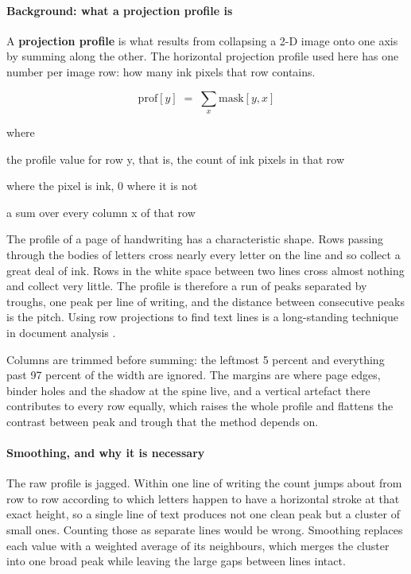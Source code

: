 \paragraph{Background: what a projection profile is}
A \textbf{projection profile} is what results from collapsing a 2-D image onto one axis by summing along the other. The horizontal projection profile used here has one number per image row: how many ink pixels that row contains.


\begin{equation}
\mathrm{prof}[y] \;=\; \sum_{x} \mathrm{mask}[y,x]
\end{equation}

\noindent where
\begin{description}[leftmargin=2.4em,style=nextline,font=\normalfont\ttfamily]\setlength\itemsep{1pt}
  \item[{$\mathrm{prof}[y]$}] \normalfont the profile value for row y, that is, the count of ink pixels in that row
  \item[{$\mathrm{mask}[y,x]$}]  where the pixel is ink, 0 where it is not
  \item[{$\sum_{x}$}] \normalfont a sum over every column x of that row
\end{description}
The profile of a page of handwriting has a characteristic shape. Rows passing through the bodies of letters cross nearly every letter on the line and so collect a great deal of ink. Rows in the white space between two lines cross almost nothing and collect very little. The profile is therefore a run of peaks separated by troughs, one peak per line of writing, and the distance between consecutive peaks is the pitch. Using row projections to find text lines is a long-standing technique in document analysis \cite{postl1986}.

Columns are trimmed before summing: the leftmost 5 percent and everything past 97 percent of the width are ignored. The margins are where page edges, binder holes and the shadow at the spine live, and a vertical artefact there contributes to every row equally, which raises the whole profile and flattens the contrast between peak and trough that the method depends on.


\paragraph{Smoothing, and why it is necessary}
The raw profile is jagged. Within one line of writing the count jumps about from row to row according to which letters happen to have a horizontal stroke at that exact height, so a single line of text produces not one clean peak but a cluster of small ones. Counting those as separate lines would be wrong. Smoothing replaces each value with a weighted average of its neighbours, which merges the cluster into one broad peak while leaving the large gaps between lines intact.



